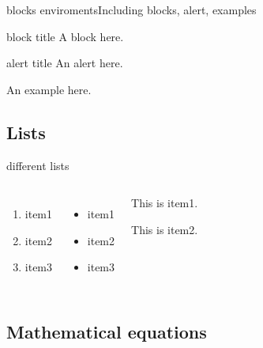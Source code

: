 \documentclass[aspectratio=169]{beamer}
\begin{document}

\begin{frame}{blocks enviroments}{Including blocks, alert, examples}
	\begin{block}{block title}
		A block here.
	\end{block}

	\begin{alertblock}{alert title}
		An alert here.
	\end{alertblock}
	
	\begin{examples}[example]
		An example here.
	\end{examples}
\end{frame}


\subsection{Lists}
\begin{frame}[t]{different lists}
\begin{columns}
	\begin{enumerate}
		\item item1
		\item item2
		\item item3
	\end{enumerate}
	
	\begin{itemize}
		\item item1
		\item item2
		\item item3
	\end{itemize}
	
	\pause
	
	\begin{description}[l]
		\item[item1] This is item1.
		\item[item2] This is item2.
	\end{description}	
\end{columns}
\end{frame}


\subsection{Mathematical equations}
\end{document}
